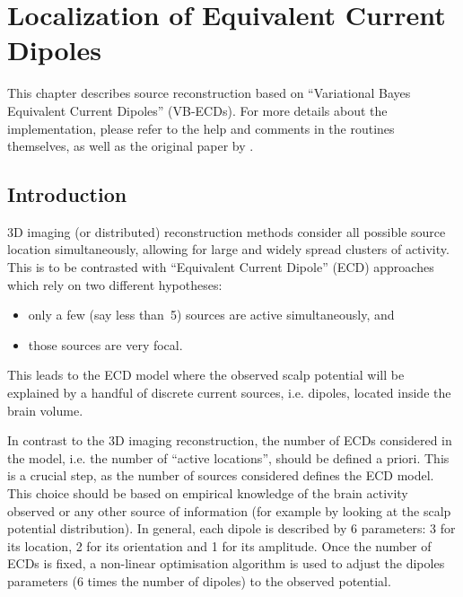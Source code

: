 \chapter{Localization of Equivalent Current Dipoles \label{Chap:eeg:VBECD}}

This chapter describes source reconstruction based on ``Variational Bayes Equivalent Current Dipoles'' (VB-ECDs).
For more details about the implementation, please refer to the help and comments in the routines themselves, as well as the original paper by \cite{stefan_vb_ecd}.

\section{Introduction}
3D imaging (or distributed) reconstruction methods consider all possible source location simultaneously, allowing for large and widely spread clusters of activity. This is to be contrasted with ``Equivalent Current Dipole'' (ECD) approaches which rely on two different hypotheses:
\begin{itemize}
\item only a few (say less than~5) sources are active simultaneously, and
\item those sources are very focal.
\end{itemize}
This leads to the ECD model where the observed scalp potential will be explained by a handful of discrete current sources, i.e. dipoles, located inside the brain volume.

In contrast to the 3D imaging reconstruction, the number of ECDs considered in the model, i.e. the number of ``active locations'', should be defined a priori. This is a crucial step, as the number of sources considered defines the ECD model. This choice should be based on empirical knowledge of the brain activity observed or any other source of information (for example by looking at the scalp potential distribution).
In general, each dipole is described by 6 parameters: 3 for its location, 2 for its orientation and 1 for its amplitude. Once the number of ECDs is fixed, a non-linear optimisation algorithm is used to adjust the dipoles parameters (6 times the number of dipoles) to the observed potential.


